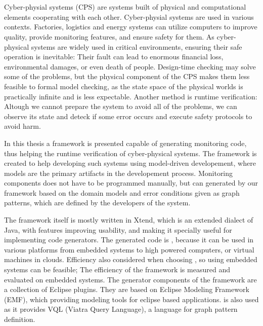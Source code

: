 \chapter{\bevezetes}

Cyber-physial systems (CPS) are systems built of physical and computational elements cooperating with each other.
Cyber-physial systems are used in various contexts. 
Factories, logistics and energy systems can utilize computers to improve quality, provide monitoring features, and ensure safety for them.
As cyber-physical systems are widely used in critical environments, ensuring their safe operation is inevitable: Their fault can lead to enormous financial loss, environmental damages, or even death of people.
Design-time checking may solve some of the problems, but the physical component of the CPS makes them less feasible to formal model checking, as the state space of the physical worlds is practically infinite and is less expectable.
Another method is runtime verification: Altough we cannot prepare the system to avoid all of the problems, we can observe its state and deteck if some error occurs and execute safety protocols to avoid harm. 


In this thesis a framework is presented capable of generating monitoring code, thus helping the runtime verification of cyber-physical systems. 
The framework is created to help developing such systems using model-driven developement, where models are the primary artifacts in the developement process.
Monitoring components does not have to be programmed manually, but can generated by our framework based on the domain models and error conditions given as graph patterns, which are defined by the developers of the system.

The framework itself is mostly written in Xtend, which is an extended dialect of Java, with features improving usability, and making it specially useful for implementing code generators. 
The generated code is \cpp{}, because it can be used in various platforms from embedded systems to high powered computers, or virtual machines in clouds. 
Efficiency also considered when choosing \cpp{}, so using embedded systems can be feasible; 
The efficiency of the framework is measured and evaluated on embedded systems. 
The generator components of the framework are a collection of Eclipse plugins.
They are based on Eclipse Modeling Framework (EMF), which providing modeling tools for eclipse based applications.
\viatra is also used as it provides VQL (Viatra Query Language), a language for graph pattern definition.

